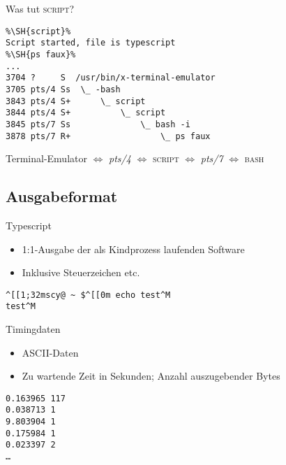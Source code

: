 \documentclass[ignorenonframetext,ucs]{beamer}
\newcommand\SH[1]{{\color{green}\$ }{\color{white}#1}}
\def\cmd{\textsc}
\begin{document}
\begin{frame}[fragile=singleslide]{Was tut \cmd{script}?}
\begin{example}
\begin{lstlisting}
%\SH{script}%
Script started, file is typescript
%\SH{ps faux}%
...
3704 ?     S  /usr/bin/x-terminal-emulator
3705 pts/4 Ss  \_ -bash
3843 pts/4 S+      \_ script
3844 pts/4 S+          \_ script
3845 pts/7 Ss              \_ bash -i
3878 pts/7 R+                  \_ ps faux
\end{lstlisting}
\end{example}
\begin{center}
Terminal-Emulator $\Leftrightarrow$ \emph{pts/4} $\Leftrightarrow$ \cmd{script} $\Leftrightarrow$ \emph{pts/7} $\Leftrightarrow$ \cmd{bash}
\end{center}
\end{frame}

\subsection{Ausgabeformat}

\begin{frame}[fragile=singleslide]{Typescript}
\begin{itemize}
\item 1:1-Ausgabe der als Kindprozess laufenden Software
\item Inklusive Steuerzeichen etc.
\end{itemize}
\begin{example}
\begin{verbatim}
^[[1;32mscy@ ~ $^[[0m echo test^M
test^M
\end{verbatim}
\end{example}
\end{frame}

\begin{frame}[fragile=singleslide]{Timingdaten}
\begin{itemize}
\item ASCII-Daten
\item Zu wartende Zeit in Sekunden; Anzahl auszugebender Bytes
\end{itemize}
\begin{example}
\begin{verbatim}
0.163965 117
0.038713 1
9.803904 1
0.175984 1
0.023397 2
…
\end{verbatim}
\end{example}
\end{frame}
\end{document}
